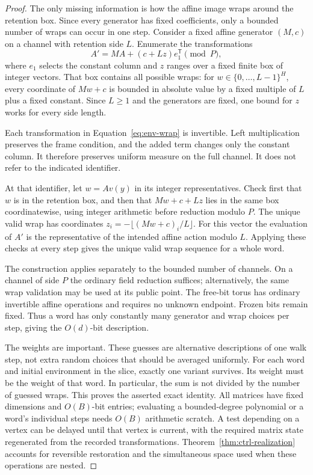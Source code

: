 \begin{proof}
The only missing information is how the affine image wraps around the retention box. Since every generator has fixed coefficients, only a bounded number of wraps can occur in one step. Consider a fixed affine generator $(M,c)$ on a channel with retention
side $L$. Enumerate the transformations
\begin{equation}\label{eq:env-wrap}
A'=MA+(c+Lz)e_1^{\mathsf T}\pmod P,
\end{equation}
where $e_1$ selects the constant column and $z$ ranges over a fixed
finite box of integer vectors. That box contains all possible wraps:
for $w\in\{0,\ldots,L-1\}^H$, every coordinate of $Mw+c$ is bounded
in absolute value by a fixed multiple of $L$ plus a fixed constant.
Since $L\ge1$ and the generators are fixed, one bound for $z$ works
for every side length.

Each transformation in Equation~\eqref{eq:env-wrap} is invertible.
Left multiplication preserves the frame condition, and the added
term changes only the constant column. It therefore preserves uniform
measure on the full channel. It does not refer to the indicated
identifier.

At that identifier, let $w=Av(y)$ in its integer representatives.
Check first that $w$ is in the retention box, and then that
$Mw+c+Lz$ lies in the same box coordinatewise, using integer arithmetic
before reduction modulo $P$. The unique valid wrap has coordinates
$z_i=-\lfloor(Mw+c)_i/L\rfloor$. For this vector the evaluation of
$A'$ is the representative of the intended affine action modulo $L$.
Applying these checks at every step gives the unique valid wrap
sequence for a whole word.

The construction applies separately to the bounded number of channels.
On a channel of side $P$ the ordinary field reduction suffices;
alternatively, the same wrap validation may be used at its public
point. The free-bit torus has ordinary invertible affine operations
and requires no unknown endpoint. Frozen bits remain fixed.
Thus a word has only constantly many generator and wrap choices
per step, giving the $O(d)$-bit description.

The weights are important. These guesses are alternative descriptions of one walk step, not extra random choices that should be averaged uniformly. For each word and initial environment in the slice, exactly one variant survives. Its weight must be the weight of that word.
In particular, the sum is not divided by the number of guessed
wraps. This proves the asserted exact identity.
All matrices have fixed dimensions and $O(B)$-bit entries;
evaluating a bounded-degree polynomial or a word's individual steps
needs $O(B)$ arithmetic scratch. A test depending on a vertex can
be delayed until that vertex is current, with the required matrix
state regenerated from the recorded transformations.
Theorem~\ref{thm:ctrl-realization} accounts for reversible restoration
and the simultaneous space used when these operations are nested.
\end{proof}

